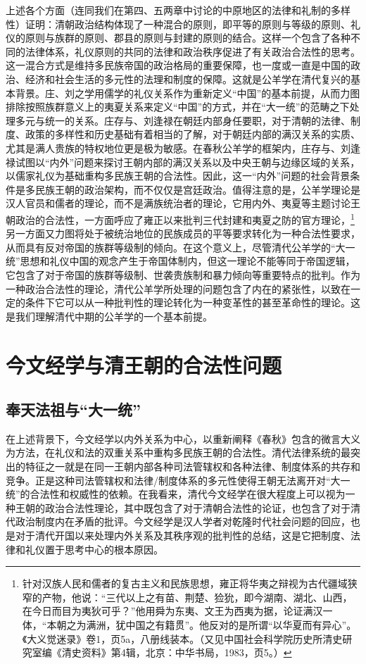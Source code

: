 \documentclass[a4paper, 12pt, openright]{ctexbook}
\begin{document}
上述各个方面（连同我们在第四、五两章中讨论的中原地区的法律和礼制的多样性）证明：清朝政治结构体现了一种混合的原则，即平等的原则与等级的原则、礼仪的原则与族群的原则、郡县的原则与封建的原则的结合。这样一个包含了各种不同的法律体系，礼仪原则的共同的法律和政治秩序促进了有关政治合法性的思考。这一混合方式是维持多民族帝国的政治格局的重要保障，也一度或一直是中国的政治、经济和社会生活的多元性的法理和制度的保障。这就是公羊学在清代复兴的基本背景。庄、刘之学用儒学的礼仪关系作为重新定义“中国”的基本前提，从而力图排除按照族群意义上的夷夏关系来定义“中国”的方式，并在“大一统”的范畴之下处理多元与统一的关系。庄存与、刘逢禄在朝廷内部身任要职，对于清朝的法律、制度、政策的多样性和历史基础有着相当的了解，对于朝廷内部的满汉关系的实质、尤其是满人贵族的特权地位更是极为敏感。在春秋公羊学的框架内，庄存与、刘逢禄试图以“内外”问题来探讨王朝内部的满汉关系以及中央王朝与边缘区域的关系，以儒家礼仪为基础重构多民族王朝的合法性。因此，这一“内外”问题的社会背景条件是多民族王朝的政治架构，而不仅仅是宫廷政治。值得注意的是，公羊学理论是汉人官员和儒者的理论，而不是满族统治者的理论，它用内外、夷夏等主题讨论王朝政治的合法性，一方面呼应了雍正以来批判三代封建和夷夏之防的官方理论，\footnote{针对汉族人民和儒者的复古主义和民族思想，雍正将华夷之辩视为古代疆域狭窄的产物，他说：“三代以上之有苗、荆楚、猃狁，即今湖南、湖北、山西，在今日而目为夷狄可乎？”他用舜为东夷、文王为西夷为据，论证满汉一体，“本朝之为满洲，犹中国之有籍贯”。他反对的是所谓“以华夏而有异心”。《大义觉迷录》卷1，页5a，八册线装本。（又见中国社会科学院历史所清史研究室编《清史资料》第4辑，北京：中华书局，1983，页5。）}另一方面又力图将处于被统治地位的民族成员的平等要求转化为一种合法性要求，从而具有反对帝国的族群等级制的倾向。在这个意义上，尽管清代公羊学的“大一统”思想和礼仪中国的观念产生于帝国体制内，但这一理论不能等同于帝国逻辑，它包含了对于帝国的族群等级制、世袭贵族制和暴力倾向等重要特点的批判。作为一种政治合法性的理论，清代公羊学所处理的问题包含了内在的紧张性，以致在一定的条件下它可以从一种批判性的理论转化为一种变革性的甚至革命性的理论。这是我们理解清代中期的公羊学的一个基本前提。

\section{今文经学与清王朝的合法性问题}

\subsection{奉天法祖与“大一统”}

在上述背景下，今文经学以内外关系为中心，以重新阐释《春秋》包含的微言大义为方法，在礼仪和法的双重关系中重构多民族王朝的合法性。清代法律系统的最突出的特征之一就是在同一王朝内部各种司法管辖权和各种法律、制度体系的共存和竞争。正是这种司法管辖权和法律/制度体系的多元性使得王朝无法离开对“大一统”的合法性和权威性的依赖。在我看来，清代今文经学在很大程度上可以视为一种王朝的政治合法性理论，其中既包含了对于清朝合法性的论证，也包含了对于清代政治制度内在矛盾的批评。今文经学是汉人学者对乾隆时代社会问题的回应，也是对于清代开国以来处理内外关系及其秩序观的批判性的总结，这是它把制度、法律和礼仪置于思考中心的根本原因。
\end{document}
